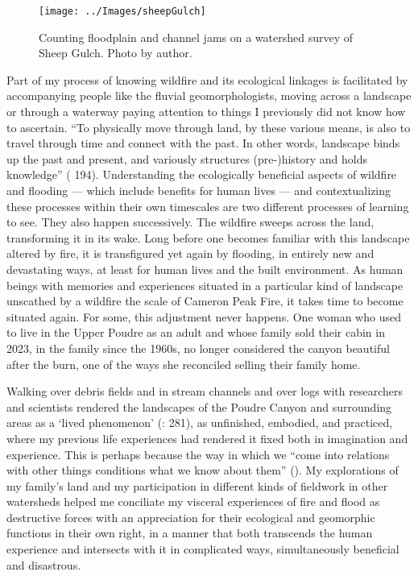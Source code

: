 \documentclass[
]{article}
\begin{document}
\begin{figure}
\texttt{[image: ../Images/sheepGulch]} \caption[Sheep Creek survey]{Counting floodplain and channel jams on a watershed survey of Sheep Gulch. Photo by author.}\label{fig:figureTitle7}
\end{figure}

Part of my process of knowing wildfire and its ecological linkages is facilitated by accompanying people like the fluvial geomorphologists, moving across a landscape or through a waterway paying attention to things I previously did not know how to ascertain. ``To physically move through land, by these various means, is also to travel through time and connect with the past. In other words, landscape binds up the past and present, and variously structures (pre-)history and holds knowledge'' ( 194). Understanding the ecologically beneficial aspects of wildfire and flooding --- which include benefits for human lives --- and contextualizing these processes within their own timescales are two different processes of learning to see. They also happen successively. The wildfire sweeps across the land, transforming it in its wake. Long before one becomes familiar with this landscape altered by fire, it is transfigured yet again by flooding, in entirely new and devastating ways, at least for human lives and the built environment. As human beings with memories and experiences situated in a particular kind of landscape unscathed by a wildfire the scale of Cameron Peak Fire, it takes time to become situated again. For some, this adjustment never happens. One woman who used to live in the Upper Poudre as an adult and whose family sold their cabin in 2023, in the family since the 1960s, no longer considered the canyon beautiful after the burn, one of the ways she reconciled selling their family home.

Walking over debris fields and in stream channels and over logs with researchers and scientists rendered the landscapes of the Poudre Canyon and surrounding areas as a `lived phenomenon' (: 281), as unfinished, embodied, and practiced, where my previous life experiences had rendered it fixed both in imagination and experience. This is perhaps because the way in which we ``come into relations with other things conditions what we know about them'' (). My explorations of my family's land and my participation in different kinds of fieldwork in other watersheds helped me conciliate my visceral experiences of fire and flood as destructive forces with an appreciation for their ecological and geomorphic functions in their own right, in a manner that both transcends the human experience and intersects with it in complicated ways, simultaneously beneficial and disastrous.
\end{document}
